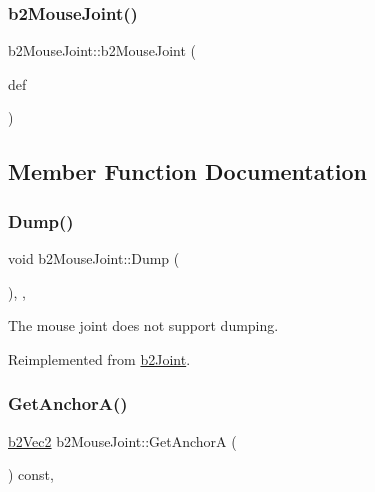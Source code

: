 \subsubsection{\texorpdfstring{b2MouseJoint()}{b2MouseJoint()}}
{\footnotesize\ttfamily b2\+Mouse\+Joint\+::b2\+Mouse\+Joint (\begin{DoxyParamCaption}\item[{const \mbox{\hyperlink{structb2_mouse_joint_def}{b2\+Mouse\+Joint\+Def}} $\ast$}]{def }\end{DoxyParamCaption})\hspace{0.3cm}{\ttfamily [protected]}}



\subsection{Member Function Documentation}
\mbox{\label{classb2_mouse_joint_aea1ff1e5b71ba5630875585cab1e2a96}} 
\subsubsection{\texorpdfstring{Dump()}{Dump()}}
{\footnotesize\ttfamily void b2\+Mouse\+Joint\+::\+Dump (\begin{DoxyParamCaption}{ }\end{DoxyParamCaption})\hspace{0.3cm}{\ttfamily [inline]}, {\ttfamily [override]}, {\ttfamily [virtual]}}



The mouse joint does not support dumping. 



Reimplemented from \mbox{\hyperlink{classb2_joint_abd35e7316017ad9a40d5dbf9b5ba3f36}{b2\+Joint}}.

\mbox{\label{classb2_mouse_joint_a3c42531ac763bca3658a987d0ac7d2c4}} 
\subsubsection{\texorpdfstring{GetAnchorA()}{GetAnchorA()}}
{\footnotesize\ttfamily \mbox{\hyperlink{structb2_vec2}{b2\+Vec2}} b2\+Mouse\+Joint\+::\+Get\+AnchorA (\begin{DoxyParamCaption}{ }\end{DoxyParamCaption}) const\hspace{0.3cm}{\ttfamily [override]}, {\ttfamily [virtual]}}



